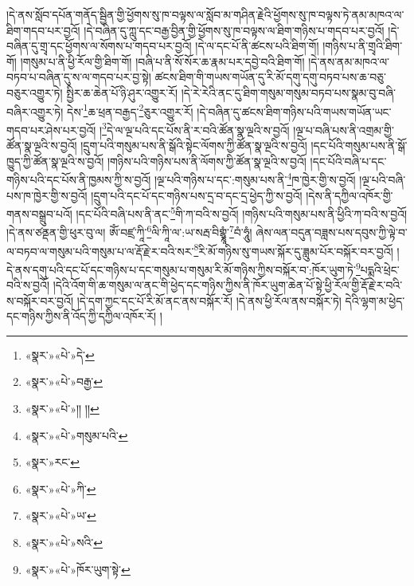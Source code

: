 །དེ་ནས་སློབ་དཔོན་གནོད་སྦྱིན་གྱི་ཕྱོགས་སུ་ཁ་བལྟས་ལ་སློབ་མ་གཤིན་རྗེའི་ཕྱོགས་སུ་ཁ་བལྟས་ཏེ་ནམ་མཁའ་ལ་ཐིག་གདབ་པར་བྱའོ། །དེ་བཞིན་དུ་ཀླུ་དང་བརྒྱ་བྱིན་གྱི་ཕྱོགས་སུ་ཁ་བལྟས་ལ་ཐིག་གཉིས་པ་གདབ་པར་བྱའོ། །དེ་བཞིན་དུ་གྲྭ་དང་ཕྱོགས་ལ་སོགས་པ་གདབ་པར་བྱའོ། །དེ་ལ་དང་པོ་ནི་ཚངས་པའི་ཐིག་གོ། །གཉིས་པ་ནི་གྲྭའི་ཐིག་གོ། །གསུམ་པ་ནི་ཕྱི་རོལ་གྱི་ཐིག་གོ། །བཞི་པ་ནི་སོ་སོར་ཆ་རྣམ་པར་དབྱེ་བའི་ཐིག་གོ། །དེ་ནས་ནམ་མཁའ་ལ་བཏབ་པ་བཞིན་དུ་ས་ལ་གདབ་པར་བྱ་སྟེ། ཚངས་ཐིག་གི་གཡས་གཡོན་དུ་རི་མོ་དགུ་དགུ་བཏབ་པས་ཆ་བཅུ་བཅུར་འགྱུར་ཏེ། སྤྱིར་ཆ་ཆེན་པོ་ཉི་ཤུར་འགྱུར་རོ། །དེ་རེ་རེའི་ནང་དུ་ཐིག་གསུམ་གསུམ་བཏབ་པས་སྣམ་བུ་བཞི་བཞིར་འགྱུར་ཏེ། དེས་\footnote{«སྣར་»«པེ་»དེ་}ཆ་ཕྲན་བརྒྱད་\footnote{«སྣར་»«པེ་»བརྒྱ་}ཅུར་འགྱུར་རོ། །དེ་བཞིན་དུ་ཚངས་ཐིག་གཉིས་པའི་གཡས་གཡོན་ཡང་གདབ་པར་ཤེས་པར་བྱའོ། །\footnote{«སྣར་»«པེ་»།། །།}དེ་ལ་ལྔ་པའི་དང་པོས་ནི་ར་བའི་ཚོན་སྣ་ལྔའི་ས་བྱའོ། །ལྔ་པ་བཞི་པས་ནི་འགྲམ་གྱི་ཚོན་སྣ་ལྔའི་ས་བྱའོ། །དྲུག་པའི་གསུམ་པས་ནི་སྒོའི་སྟེང་ལོགས་ཀྱི་ཚོན་སྣ་ལྔའི་ས་བྱའོ། །དང་པོའི་གསུམ་པས་ནི་སྒོ་ཁྱུད་ཀྱི་ཚོན་སྣ་ལྔའི་ས་བྱའོ། །གཉིས་པའི་གཉིས་པས་ནི་ལོགས་ཀྱི་ཚོན་སྣ་ལྔའི་ས་བྱའོ། །དང་པོའི་བཞི་པ་དང་གཉིས་པའི་དང་པོས་ནི་ཁྱམས་ཀྱི་ས་བྱའོ། །ལྔ་པའི་གཉིས་པ་དང་:གསུམ་པས་ནི་\footnote{«སྣར་»«པེ་»གསུམ་པའི་}ཁ་ཁྱེར་གྱི་ས་བྱའོ། །ལྔ་པའི་བཞི་པས་ཁ་ཁྱེར་གྱི་ས་བྱའོ། །དྲུག་པའི་དང་པོ་དང་གཉིས་པས་དྲ་བ་དང་དྲ་ཕྱེད་ཀྱི་ས་བྱའོ། །དེས་ནི་དཀྱིལ་འཁོར་གྱི་གནས་བསྒྲུབ་པའོ། །དང་པོའི་བཞི་པས་ནི་ནང་\footnote{«སྣར་»རང་}གི་ཀ་བའི་ས་བྱའོ། །གཉིས་པའི་གསུམ་པས་ནི་ཕྱིའི་ཀ་བའི་ས་བྱའོ། །དེ་ནས་ཙནྡན་གྱི་ཕུར་བུ་ལ། ཨོཾ་བཛྲ་ཀཱི་\footnote{«སྣར་»«པེ་»ཀི་}ལི་ཀཱི་ལ་:ཡ་སརྦ་བིགྷྣཱཾ་\footnote{«སྣར་»«པེ་»ཡ་}བཾ་ཧཱུཾ། ཞེས་ལན་བདུན་བཟླས་པས་དབུས་ཀྱི་ལྟེ་བ་ལ་བཏབ་ལ་གསུམ་པའི་གསུམ་པ་ལ་རྡོ་རྗེ་ར་བའི་སར་\footnote{«སྣར་»«པེ་»སའི་}རི་མོ་གཉིས་སུ་གཡས་སྐོར་དུ་ཟླུམ་པོར་བསྐོར་བར་བྱའོ། །དེ་ནས་དགུ་པའི་དང་པོ་དང་གཉིས་པ་དང་གསུམ་པ་གསུམ་རི་མོ་གཉིས་ཀྱིས་བསྐོར་བ་:ཁོར་ཡུག་ཏེ་\footnote{«སྣར་»«པེ་»ཁོར་ཡུག་སྟེ་}པདྨའི་ཕྲེང་བའི་ས་བྱའོ། །དེའི་འོག་གི་ཆ་གསུམ་ལ་ནང་གི་ཕྱེད་དང་གཉིས་ཀྱིས་ནི་ཁོར་ཡུག་ཆེན་པོ་སྟེ་ཕྱི་རོལ་གྱི་རྡོ་རྗེ་ར་བའི་ས་བསྐོར་བར་བྱའོ། །དེ་དག་ཀྱང་དང་པོ་རི་མོ་ནང་ནས་བསྐོར་རོ། །དེ་ནས་ཕྱི་རོལ་ནས་བསྐོར་ཏེ། དེའི་ལྷག་མ་ཕྱེད་དང་གཉིས་ཀྱིས་ནི་འོད་ཀྱི་དཀྱིལ་འཁོར་རོ། །

